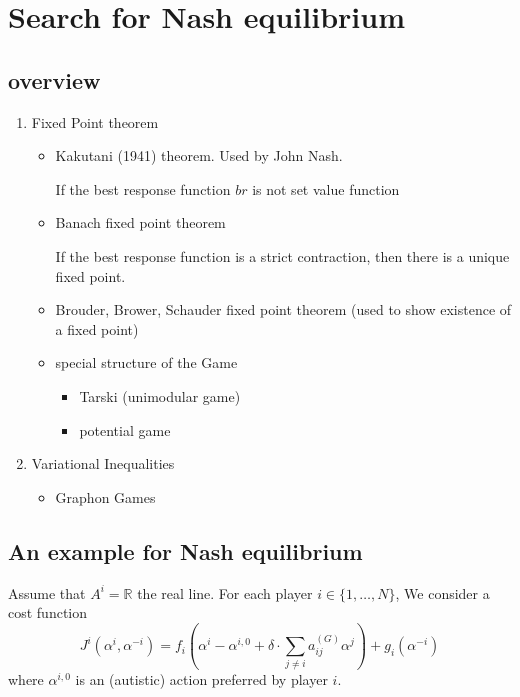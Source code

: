 \section{Search for Nash equilibrium}

\subsection{overview}
\begin{enumerate}
	\item Fixed Point theorem
			\begin{itemize}
				\item Kakutani (1941) theorem. Used by John Nash.
				
					  If the best response function $br$ is not set value function
				\item Banach fixed point theorem
				
						If the best response function is a strict contraction, then there is a unique fixed point.
				\item Brouder, Brower, Schauder fixed point theorem (used to show existence of a fixed point)
				\item special structure of the Game
						\begin{itemize}
							\item Tarski (unimodular game)
							\item potential game
						\end{itemize}
			\end{itemize}
	\item Variational Inequalities
			\begin{itemize}
				\item Graphon Games
			\end{itemize}
\end{enumerate}

\subsection{An example for Nash equilibrium}

Assume that $A^i = \mathbb{R}$ the real line. For each player $i \in \{1,\ldots,N\}$, We consider a cost function
$$
	J^{i}(\alpha^i, \alpha^{-i}) = f_i(\alpha^i - \alpha^{i,0} + \delta \cdot \sum_{j \neq i} a_{ij}^{(G)} \alpha^j ) + g_i(\alpha^{-i})
$$
where $\alpha^{i,0}$ is an (autistic) action preferred by player $i$. 

